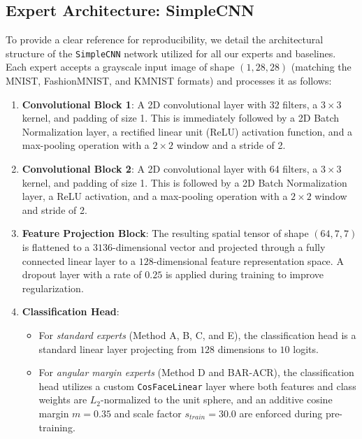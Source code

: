 \documentclass{article}
\theoremstyle{definition}
\theoremstyle{remark}
\begin{document}
\subsection{Expert Architecture: SimpleCNN}
To provide a clear reference for reproducibility, we detail the architectural structure of the \texttt{SimpleCNN} network utilized for all our experts and baselines. Each expert accepts a grayscale input image of shape $(1, 28, 28)$ (matching the MNIST, FashionMNIST, and KMNIST formats) and processes it as follows:
\begin{enumerate}
    \item \textbf{Convolutional Block 1}: A 2D convolutional layer with 32 filters, a $3 \times 3$ kernel, and padding of size 1. This is immediately followed by a 2D Batch Normalization layer, a rectified linear unit (ReLU) activation function, and a max-pooling operation with a $2 \times 2$ window and a stride of 2.
    \item \textbf{Convolutional Block 2}: A 2D convolutional layer with 64 filters, a $3 \times 3$ kernel, and padding of size 1. This is followed by a 2D Batch Normalization layer, a ReLU activation, and a max-pooling operation with a $2 \times 2$ window and stride of 2.
    \item \textbf{Feature Projection Block}: The resulting spatial tensor of shape $(64, 7, 7)$ is flattened to a $3136$-dimensional vector and projected through a fully connected linear layer to a $128$-dimensional feature representation space. A dropout layer with a rate of $0.25$ is applied during training to improve regularization.
    \item \textbf{Classification Head}:
    \begin{itemize}
        \item For \textit{standard experts} (Method A, B, C, and E), the classification head is a standard linear layer projecting from $128$ dimensions to $10$ logits.
        \item For \textit{angular margin experts} (Method D and BAR-ACR), the classification head utilizes a custom \texttt{CosFaceLinear} layer where both features and class weights are $L_2$-normalized to the unit sphere, and an additive cosine margin $m = 0.35$ and scale factor $s_{train} = 30.0$ are enforced during pre-training.
    \end{itemize}
\end{enumerate}
\end{document}
